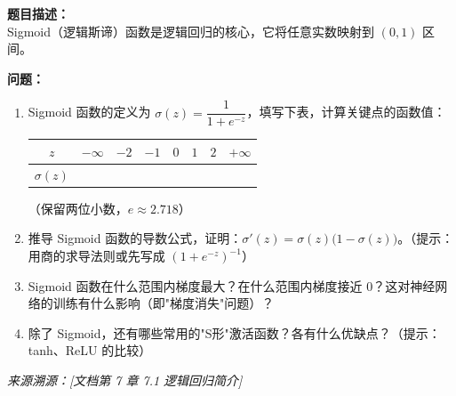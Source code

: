 \documentclass[a4paper,11pt]{ctexart}
\begin{document}
\begin{problembox}
    \textbf{题目描述：}\\
    Sigmoid（逻辑斯谛）函数是逻辑回归的核心，它将任意实数映射到 $(0,1)$ 区间。

    \vspace{0.3cm}
    \textbf{问题：}
    \begin{enumerate}[(1)]
        \item Sigmoid 函数的定义为 $\sigma(z) = \dfrac{1}{1+e^{-z}}$，填写下表，计算关键点的函数值：

        \begin{center}
        \begin{tabular}{ccccccc}
            \toprule
            $z$ & $-\infty$ & $-2$ & $-1$ & $0$ & $1$ & $2$ & $+\infty$ \\
            \midrule
            $\sigma(z)$ & \underline{\quad} & \underline{\quad} & \underline{\quad} & \underline{\quad} & \underline{\quad} & \underline{\quad} & \underline{\quad} \\
            \bottomrule
        \end{tabular}
        \end{center}
        （保留两位小数，$e\approx2.718$）

        \item 推导 Sigmoid 函数的导数公式，证明：$\sigma'(z) = \sigma(z)\big(1-\sigma(z)\big)$。（提示：用商的求导法则或先写成 $(1+e^{-z})^{-1}$）

        \item Sigmoid 函数在什么范围内梯度最大？在什么范围内梯度接近 0？这对神经网络的训练有什么影响（即"梯度消失"问题）？

        \item 除了 Sigmoid，还有哪些常用的"S形"激活函数？各有什么优缺点？（提示：tanh、ReLU 的比较）
    \end{enumerate}
    {\color{gray}\small\textit{来源溯源：[文档第 7 章 7.1 逻辑回归简介]}}
\end{problembox}
\end{document}
